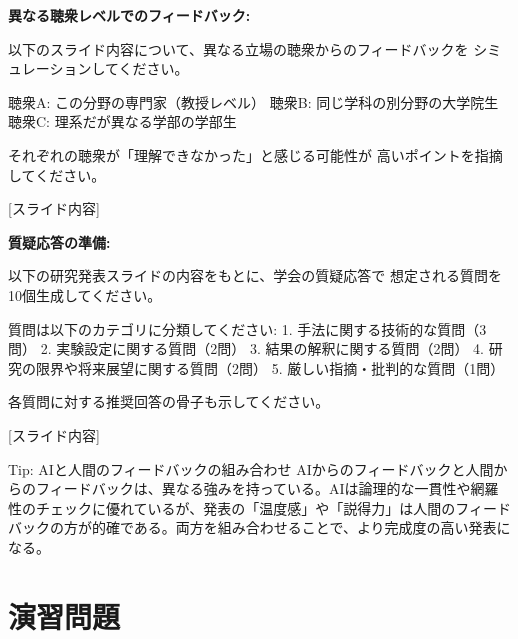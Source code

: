 \textbf{異なる聴衆レベルでのフィードバック:}

\begin{promptbox}
以下のスライド内容について、異なる立場の聴衆からのフィードバックを
シミュレーションしてください。

聴衆A: この分野の専門家（教授レベル）
聴衆B: 同じ学科の別分野の大学院生
聴衆C: 理系だが異なる学部の学部生

それぞれの聴衆が「理解できなかった」と感じる可能性が
高いポイントを指摘してください。

{[}スライド内容]
\end{promptbox}

\textbf{質疑応答の準備:}

\begin{promptbox}
以下の研究発表スライドの内容をもとに、学会の質疑応答で
想定される質問を10個生成してください。

質問は以下のカテゴリに分類してください:
1. 手法に関する技術的な質問（3問）
2. 実験設定に関する質問（2問）
3. 結果の解釈に関する質問（2問）
4. 研究の限界や将来展望に関する質問（2問）
5. 厳しい指摘・批判的な質問（1問）

各質問に対する推奨回答の骨子も示してください。

{[}スライド内容]
\end{promptbox}

\begin{itembox}[l]{Tip: AIと人間のフィードバックの組み合わせ}
AIからのフィードバックと人間からのフィードバックは、異なる強みを持っている。AIは論理的な一貫性や網羅性のチェックに優れているが、発表の「温度感」や「説得力」は人間のフィードバックの方が的確である。両方を組み合わせることで、より完成度の高い発表になる。
\end{itembox}

\section*{演習問題}

